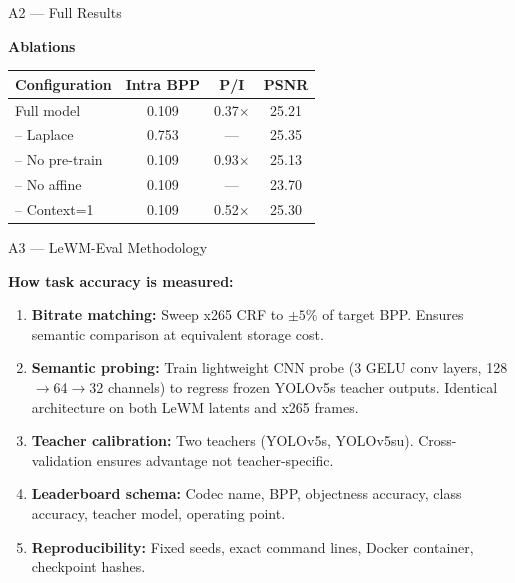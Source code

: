 \documentclass[aspectratio=169, professionalfonts, 10pt]{beamer}
\begin{document}
\begin{frame}[allowframebreaks]{A2 --- Full Results}
  \bigskip
  \begin{center}
    \textbf{Ablations}
  \end{center}

  \begin{tabular}{lccc}
    \toprule
    Configuration & Intra BPP & P/I & PSNR \\
    \midrule
    Full model & 0.109 & 0.37$\times$ & 25.21 \\
    -- Laplace  & 0.753 & --- & 25.35 \\
    -- No pre-train & 0.109 & 0.93$\times$ & 25.13 \\
    -- No affine & 0.109 & --- & 23.70 \\
    -- Context=1 & 0.109 & 0.52$\times$ & 25.30 \\
    \bottomrule
  \end{tabular}
\end{frame}

\begin{frame}{A3 --- LeWM-Eval Methodology}

  \textbf{How task accuracy is measured:}

  \bigskip
  \begin{enumerate}
    \item \textbf{Bitrate matching:} Sweep x265 CRF to $\pm 5\%$ of target BPP.
          Ensures semantic comparison at equivalent storage cost.
    \bigskip
    \item \textbf{Semantic probing:} Train lightweight CNN probe (3 GELU conv layers,
          128$\to$64$\to$32 channels) to regress frozen YOLOv5s teacher outputs.
          Identical architecture on both LeWM latents and x265 frames.
    \bigskip
    \item \textbf{Teacher calibration:} Two teachers (YOLOv5s, YOLOv5su).
          Cross-validation ensures advantage not teacher-specific.
    \bigskip
    \item \textbf{Leaderboard schema:} Codec name, BPP, objectness accuracy,
          class accuracy, teacher model, operating point.
    \bigskip
    \item \textbf{Reproducibility:} Fixed seeds, exact command lines,
          Docker container, checkpoint hashes.
  \end{enumerate}
\end{frame}
\end{document}
